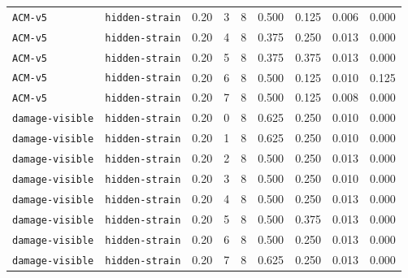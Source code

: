 \documentclass{article}
\begin{document}
\begin{center}
\begin{tabular}{llccccccc}
\texttt{ACM-v5} & \texttt{hidden-strain} & 0.20 & 3 & 8 & 0.500 & 0.125 & 0.006 & 0.000 \\
\texttt{ACM-v5} & \texttt{hidden-strain} & 0.20 & 4 & 8 & 0.375 & 0.250 & 0.013 & 0.000 \\
\texttt{ACM-v5} & \texttt{hidden-strain} & 0.20 & 5 & 8 & 0.375 & 0.375 & 0.013 & 0.000 \\
\texttt{ACM-v5} & \texttt{hidden-strain} & 0.20 & 6 & 8 & 0.500 & 0.125 & 0.010 & 0.125 \\
\texttt{ACM-v5} & \texttt{hidden-strain} & 0.20 & 7 & 8 & 0.500 & 0.125 & 0.008 & 0.000 \\
\texttt{damage-visible} & \texttt{hidden-strain} & 0.20 & 0 & 8 & 0.625 & 0.250 & 0.010 & 0.000 \\
\texttt{damage-visible} & \texttt{hidden-strain} & 0.20 & 1 & 8 & 0.625 & 0.250 & 0.010 & 0.000 \\
\texttt{damage-visible} & \texttt{hidden-strain} & 0.20 & 2 & 8 & 0.500 & 0.250 & 0.013 & 0.000 \\
\texttt{damage-visible} & \texttt{hidden-strain} & 0.20 & 3 & 8 & 0.500 & 0.250 & 0.010 & 0.000 \\
\texttt{damage-visible} & \texttt{hidden-strain} & 0.20 & 4 & 8 & 0.500 & 0.250 & 0.013 & 0.000 \\
\texttt{damage-visible} & \texttt{hidden-strain} & 0.20 & 5 & 8 & 0.500 & 0.375 & 0.013 & 0.000 \\
\texttt{damage-visible} & \texttt{hidden-strain} & 0.20 & 6 & 8 & 0.500 & 0.250 & 0.013 & 0.000 \\
\texttt{damage-visible} & \texttt{hidden-strain} & 0.20 & 7 & 8 & 0.625 & 0.250 & 0.013 & 0.000 \\
\bottomrule
\end{tabular}
\end{center}
\end{document}

